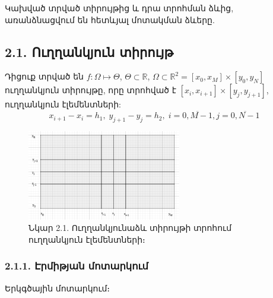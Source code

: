 \documentclass[fleqn, bachelor,subf,12pt,notitlepage]{article}
\begin{document}
Կախված տրված տիրույթից և դրա տրոհման ձևից, առանձնացվում են հետևյալ մոտակման ձևերը.
\subsection*{{2.1. Ուղղանկյուն տիրույթ}}
Դիցուք տրված են $f:\Omega\mapsto \Theta$,  $\Theta \subset \mathbb{R}$, $\Omega \subset \mathbb{R}^{2} = \left[x_{0}, x_{M}\right] \times \left[y_{0}, y_{N}\right]$  ուղղանկյուն տիրույթը, որը տրոհված է $\left[x_{i}, x_{i+1}\right] \times \left[y_{j}, y_{j+1}\right]$, ուղղանկյուն էլեմենտների:
$$x_{i+1}-x_{i}=h_{1}, \; y_{j+1}-y_{j}=h_{2}, \; i=\overline{0, M-1}, j=\overline{0, N-1}$$
\begin{figure}[h!]
\centering
\includegraphics[width=0.6\textwidth]{images/two_var_linear}
\captionsetup{labelformat=empty}
\caption{Նկար 2.1. Ուղղանկյունաձև տիրույթի տրոհում ուղղանկյուն էլեմենտների։}
\end{figure}
\newpage
\subsubsection*{{2.1.1. Էրմիթյան մոտարկում}}
{Երկգծային մոտարկում}։
\end{document}
